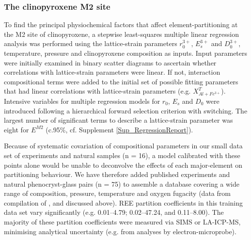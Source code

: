 \documentclass[review,authoryear,12pt]{elsarticle}
\newcommand{\dgC}{$^\circ$C }
\newcommand{\fO}{\textit{f}O$_{2}$ }
\begin{document}

	
\subsubsection{The clinopyroxene M2 site}		
	To find the principal physiochemical factors that affect element-partitioning at the M2 site of clinopyroxene, a stepwise least-squares multiple linear regression analysis was performed using the lattice-strain parameters $r_0^{3+}$, $E_s^{3+}$ and $D_0^{3+}$, temperature, pressure and clinopyroxene composition as inputs. Input parameters were initially examined in binary scatter diagrams to ascertain whether correlations with lattice-strain parameters were linear. If not, interaction compositional terms were added to the initial set of possible fitting parameters that had linear correlations with lattice-strain parameters (e.g. $X^{T}_{Al + Fe^{3+}}$). Intensive variables for multiple regression models for $r_0$, $E_s$ and $D_0$ were introduced following a hierarchical forward selection criterion with switching. The largest number of significant terms to describe a lattice-strain parameter was eight for $E^{M2}$ (c.95\%, cf. Supplement \ref{Sup_RegressionReport}).
		
	Because of systematic covariation of compositional parameters in our small data set of experiments and natural samples (n = 16), a model calibrated with these points alone would be unable to deconvolve the effects of each major-element on partitioning behaviour. We have therefore added published experiments and natural phenocryst-glass pairs (n = 75) to assemble a database covering a wide range of composition, pressure, temperature and oxygen fugacity (data from compilation of \citealt{Bedard2014}, and \citealt{Mollo2016} discussed above).
	 REE partition coefficients in this training data set vary significantly (e.g.  0.01--4.79;  0.02--47.24, and  0.11--8.00).
      The majority of these partition coefficients were measured via SIMS or LA-ICP-MS, minimising analytical uncertainty (e.g. from analyses by electron-microprobe).
\end{document}
